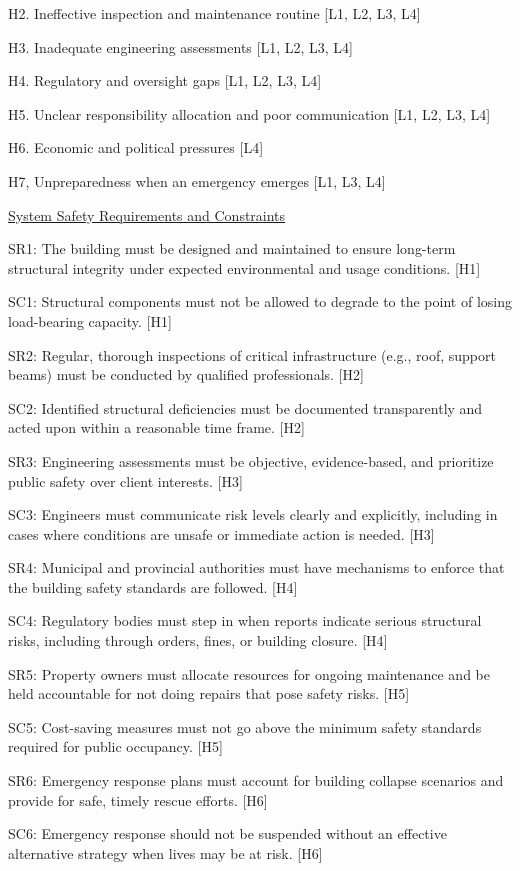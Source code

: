 \documentclass[12pt]{article}
\begin{document}
H2. Ineffective inspection and maintenance routine [L1, L2, L3, L4]

H3. Inadequate engineering assessments [L1, L2, L3, L4]

H4. Regulatory and oversight gaps [L1, L2, L3, L4]

H5. Unclear responsibility allocation and poor communication [L1, L2, L3, L4]

H6. Economic and political pressures [L4]

H7, Unpreparedness when an emergency emerges [L1, L3, L4]

\underline{System Safety Requirements and Constraints}

SR1: The building must be designed and maintained to ensure long-term structural integrity under expected environmental and usage conditions. [H1]

SC1: Structural components must not be allowed to degrade to the point of losing load-bearing capacity. [H1]

SR2: Regular, thorough inspections of critical infrastructure (e.g., roof, support beams) must be conducted by qualified professionals. [H2]

SC2: Identified structural deficiencies must be documented transparently and acted upon within a reasonable time frame. [H2]

SR3: Engineering assessments must be objective, evidence-based, and prioritize public safety over client interests. [H3]

SC3: Engineers must communicate risk levels clearly and explicitly, including in cases where conditions are unsafe or immediate action is needed. [H3]

SR4: Municipal and provincial authorities must have mechanisms to enforce that the building safety standards are followed. [H4]

SC4: Regulatory bodies must step in when reports indicate serious structural risks, including through orders, fines, or building closure. [H4]

SR5: Property owners must allocate resources for ongoing maintenance and be held accountable for not doing repairs that pose safety risks. [H5]

SC5: Cost-saving measures must not go above the minimum safety standards required for public occupancy. [H5]

SR6: Emergency response plans must account for building collapse scenarios and provide for safe, timely rescue efforts. [H6]

SC6: Emergency response should not be suspended without an effective alternative strategy when lives may be at risk. [H6]
\end{document}
